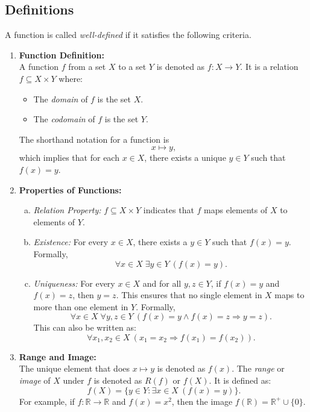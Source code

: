 \documentclass[12pt]{book}
\begin{document}
\subsection{Definitions}
 A function is called \textit{well-defined} if it satisfies the following criteria.
\begin{enumerate}
    \item \textbf{Function Definition:} \\
    A function $f$ from a set $X$ to a set $Y$ is denoted as $f \colon X \to Y$. It is a relation $f \subseteq X \times Y$ where:
    \begin{itemize}
        \item The \textit{domain} of $f$ is the set $X$.
        \item The \textit{codomain} of $f$ is the set $Y$.
    \end{itemize}
    The shorthand notation for a function is
    \[
    x \mapsto y,
    \]
    which implies that for each $x \in X$, there exists a unique $y \in Y$ such that $f(x) = y$.

    \item \textbf{Properties of Functions:}
    \begin{enumerate}[a.]
        \item \textit{Relation Property:} $f \subseteq X \times Y$ indicates that $f$ maps elements of $X$ to elements of $Y$.
        \item \textit{Existence:} For every $x \in X$, there exists a $y \in Y$ such that $f(x) = y$. Formally,
        \[
        \forall x \in X\; \exists y \in Y\ (f(x)=y).
        \]
        \item \textit{Uniqueness:} For every $x \in X$ and for all $y, z \in Y$, if $f(x) = y$ and $f(x) = z$, then $y = z$. This ensures that no single element in $X$ maps to more than one element in $Y$. Formally,
        \[
        \forall x \in X \; \forall y,z \in Y\ (f(x)=y \wedge f(x)=z \Rightarrow y=z).
        \]
        This can also be written as:
        \[
        \forall x_1, x_2 \in X\ (x_1 = x_2 \Rightarrow f(x_1) = f(x_2)).
        \]
    \end{enumerate}

    \item \textbf{Range and Image:} \\
    The unique element that does $x \mapsto y$ is denoted as $f(x)$. The \textit{range} or \textit{image} of $X$ under $f$ is denoted as $R(f)$ or $f(X)$. It is defined as:
    \[
    f(X) = \{ y \in Y \colon \exists x \in X\ (f(x) = y) \}.
    \]
    For example, if $f \colon \mathbb{R} \to \mathbb{R}$ and $f(x) = x^2$, then the image $f(\mathbb{R}) = \mathbb{R}^+ \cup \{0\}$.


\end{enumerate}
\end{document}
